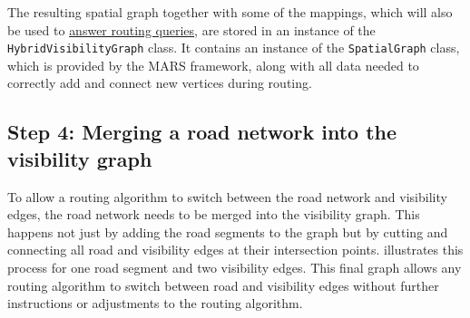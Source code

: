 		The resulting spatial graph together with some of the mappings, which will also be used to \hyperref[sec:answering-queries]{answer routing queries}, are stored in an instance of the \texttt{HybridVisibilityGraph} class.
		It contains an instance of the \texttt{SpatialGraph} class, which is provided by the MARS framework, along with all data needed to correctly add and connect new vertices during routing.
		
	\subsection{Step 4: Merging a road network into the visibility graph}
	\label{subsec:step-4-graph merging}
	
		To allow a routing algorithm to switch between the road network and visibility edges, the road network needs to be merged into the visibility graph.
		This happens not just by adding the road segments to the graph but by cutting and connecting all road and visibility edges at their intersection points.
		 illustrates this process for one road segment and two visibility edges.
		This final graph allows any routing algorithm to switch between road and visibility edges without further instructions or adjustments to the routing algorithm.
		
